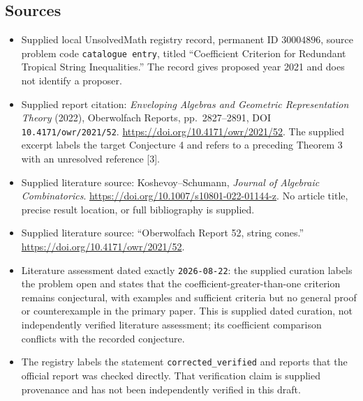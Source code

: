 \documentclass[11pt]{article}
\begin{document}
\subsection{Sources}
\begin{itemize}
\item Supplied local UnsolvedMath registry record, permanent ID \(30004896\), source problem code \texttt{catalogue entry}, titled ``Coefficient Criterion for Redundant Tropical String Inequalities.'' The record gives proposed year 2021 and does not identify a proposer.
\item Supplied report citation: \emph{Enveloping Algebras and Geometric Representation Theory} (2022), Oberwolfach Reports, pp.\ 2827--2891, DOI \texttt{10.4171/owr/2021/52}. \url{https://doi.org/10.4171/owr/2021/52}. The supplied excerpt labels the target Conjecture 4 and refers to a preceding Theorem 3 with an unresolved reference [3].
\item Supplied literature source: Koshevoy--Schumann, \emph{Journal of Algebraic Combinatorics}. \url{https://doi.org/10.1007/s10801-022-01144-z}. No article title, precise result location, or full bibliography is supplied.
\item Supplied literature source: ``Oberwolfach Report 52, string cones.'' \url{https://doi.org/10.4171/owr/2021/52}.
\item Literature assessment dated exactly \texttt{2026-08-22}: the supplied curation labels the problem open and states that the coefficient-greater-than-one criterion remains conjectural, with examples and sufficient criteria but no general proof or counterexample in the primary paper. This is supplied dated curation, not independently verified literature assessment; its coefficient comparison conflicts with the recorded conjecture.
\item The registry labels the statement \texttt{corrected\_verified} and reports that the official report was checked directly. That verification claim is supplied provenance and has not been independently verified in this draft.
\end{itemize}
\end{document}
